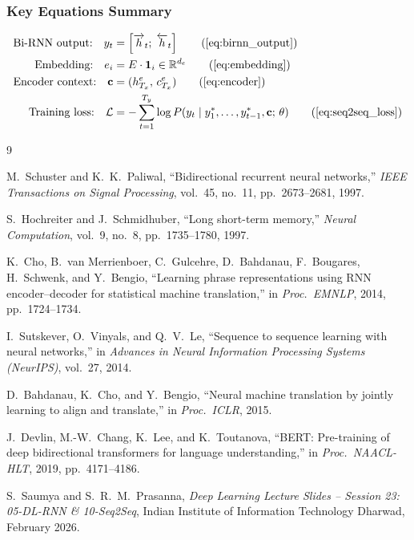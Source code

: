 \documentclass[12pt,a4paper]{article}
\begin{document}
\subsubsection*{Key Equations Summary}

\begin{align}
  \text{Bi-RNN output:} \quad
  y_t &= \left[\overrightarrow{h}_t;\;\overleftarrow{h}_t\right] \tag{\ref{eq:birnn_output}} \\
  \text{Embedding:} \quad
  e_i &= E\cdot\mathbf{1}_i \in \mathbb{R}^{d_e} \tag{\ref{eq:embedding}} \\
  \text{Encoder context:} \quad
  \mathbf{c} &= (h^e_{T_x},\, c^e_{T_x}) \tag{\ref{eq:encoder}} \\
  \text{Training loss:} \quad
  \mathcal{L} &= -\sum_{t=1}^{T_y}
    \log P(y_t \mid y^*_1, \ldots, y^*_{t-1}, \mathbf{c};\,\theta)
    \tag{\ref{eq:seq2seq_loss}}
\end{align}

\begin{thebibliography}{9}

M.\ Schuster and K.\ K.\ Paliwal,
``Bidirectional recurrent neural networks,''
\textit{IEEE Transactions on Signal Processing},
vol.~45, no.~11, pp.~2673--2681, 1997.

S.\ Hochreiter and J.\ Schmidhuber,
``Long short-term memory,''
\textit{Neural Computation},
vol.~9, no.~8, pp.~1735--1780, 1997.

K.\ Cho, B.\ van Merrienboer, C.\ Gulcehre, D.\ Bahdanau, F.\ Bougares,
H.\ Schwenk, and Y.\ Bengio,
``Learning phrase representations using RNN encoder--decoder for statistical
machine translation,''
in \textit{Proc.\ EMNLP}, 2014, pp.~1724--1734.

I.\ Sutskever, O.\ Vinyals, and Q.\ V.\ Le,
``Sequence to sequence learning with neural networks,''
in \textit{Advances in Neural Information Processing Systems (NeurIPS)},
vol.~27, 2014.

D.\ Bahdanau, K.\ Cho, and Y.\ Bengio,
``Neural machine translation by jointly learning to align and translate,''
in \textit{Proc.\ ICLR}, 2015.

J.\ Devlin, M.-W.\ Chang, K.\ Lee, and K.\ Toutanova,
``BERT: Pre-training of deep bidirectional transformers for language
understanding,''
in \textit{Proc.\ NAACL-HLT}, 2019, pp.~4171--4186.

S.\ Saumya and S.\ R.\ M.\ Prasanna,
\textit{Deep Learning Lecture Slides -- Session 23: 05-DL-RNN \&
10-Seq2Seq},
Indian Institute of Information Technology Dharwad, February 2026.

\end{thebibliography}
\end{document}
